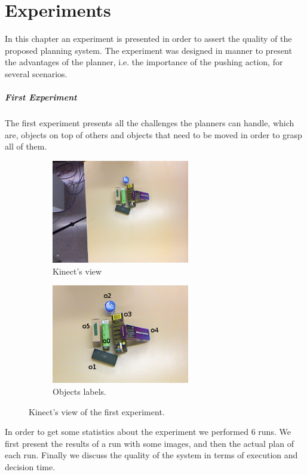 \chapter{Experiments}
\label{ch:experiments}

In this chapter an experiment is presented in order to assert the quality of the proposed planning system. The experiment was designed in manner to present the advantages of the planner, i.e. the importance of the pushing action, for several scenarios. 

\paragraph{First Experiment}
The first experiment presents all the challenges the planners can handle, which are, objects on top of others and objects that need to be moved in order to grasp all of them. 
\begin{figure}[tb]
\centering
\begin{subfigure}[t]{0.45\textwidth}
\includegraphics[width=6cm]{Img/experiments/image.png}
\caption{Kinect's view}\label{fig:experiment_good1}
\end{subfigure}
\begin{subfigure}[t]{0.45\textwidth}
\includegraphics[width=6cm]{Img/experiments/image_labels.png}
\caption{Objects labels.}\label{fig:experiment_good2}
\end{subfigure}
\caption{Kinect's view of the first experiment.}\label{fig:experiment_good}
\end{figure}
In order to get some statistics about the experiment we performed 6 runs. 
We first present the results of a run with some images, and then the actual plan of each run. Finally we discuss the quality of the system in terms of execution and decision time. 

